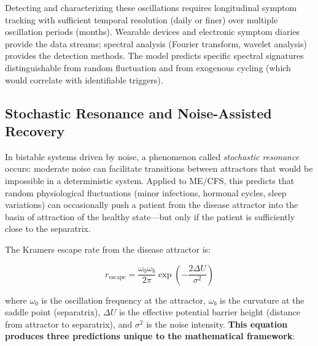 Detecting and characterizing these oscillations requires longitudinal symptom tracking with sufficient temporal resolution (daily or finer) over multiple oscillation periods (months). Wearable devices and electronic symptom diaries provide the data streams; spectral analysis (Fourier transform, wavelet analysis) provides the detection methods. The model predicts specific spectral signatures distinguishable from random fluctuation and from exogenous cycling (which would correlate with identifiable triggers).

\subsection{Stochastic Resonance and Noise-Assisted Recovery}
\label{sec:stochastic-resonance}

In bistable systems driven by noise, a phenomenon called \emph{stochastic resonance} occurs: moderate noise can facilitate transitions between attractors that would be impossible in a deterministic system. Applied to ME/CFS, this predicts that random physiological fluctuations (minor infections, hormonal cycles, sleep variations) can occasionally push a patient from the disease attractor into the basin of attraction of the healthy state---but only if the patient is sufficiently close to the separatrix.

The Kramers escape rate from the disease attractor is:

\begin{equation}
\label{eq:kramers-rate}
r_{\text{escape}} = \frac{\omega_0 \omega_b}{2\pi} \exp\left(-\frac{2\Delta U}{\sigma^2}\right)
\end{equation}

where $\omega_0$ is the oscillation frequency at the attractor, $\omega_b$ is the curvature at the saddle point (separatrix), $\Delta U$ is the effective potential barrier height (distance from attractor to separatrix), and $\sigma^2$ is the noise intensity. \textbf{This equation produces three predictions unique to the mathematical framework}:


